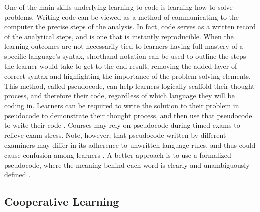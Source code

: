 One of the main skills underlying learning to code is learning how to solve problems. 
Writing code can be viewed as a method of communicating to the computer the precise steps of the analysis.
In fact, code serves as a written record of the analytical steps, and is one that is instantly reproducible.
When the learning outcomes are not necessarily tied to learners having full mastery of a specific language's syntax, shorthand notation can be used to outline the steps the learner would take to get to the end result, removing the added layer of correct syntax and highlighting the importance of the problem-solving elements.
This method, called pseudocode, can help learners logically scaffold their thought process, and therefore their code, regardless of which language they will be coding in.
Learners can be required to write the solution to their problem in pseudocode to demonstrate their thought process, and then use that pseudocode to write their code \citep[e.g.,][]{olsen_using_2005}.
Courses may rely on pseudocode during timed exams to relieve exam stress.
Note, however, that pseudocode written by different examiners may differ in its adherence to unwritten language rules, and thus could cause confusion among learners \citep{cutts_code_2014}. 
A better approach is to use a formalized pseudocode, where the meaning behind each word is clearly and unambiguously defined \citep{cutts_code_2014}.

\subsection{Cooperative Learning} 

